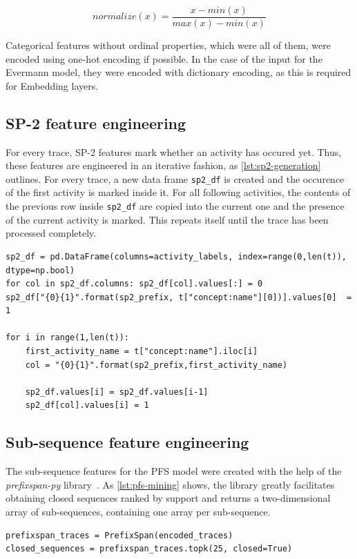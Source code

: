 $$normalize(x) = \frac{x-min(x)}{max(x)-min(x)}$$

Categorical features without ordinal properties, which were all of them, were encoded using one-hot encoding if possible. In the case of the input for the Evermann model, they were encoded with dictionary encoding, as this is required for Embedding layers.

\subsection*{SP-2 feature engineering}
For every trace, SP-2 features mark whether an activity has occured yet. Thus, these features are engineered in an iterative fashion, as \autoref{lst:sp2-generation} outlines. For every trace, a new data frame \texttt{sp2\_df} is created and the occurence of the first activity is marked inside it. For all following activities, the contents of the previous row inside \texttt{sp2\_df} are copied into the current one and the presence of the current activity is marked. This repeats itself until the trace has been processed completely.

\begin{lstlisting}[caption={SP-2 feature generation algorithm for a single trace},label={lst:sp2-generation}]
sp2_df = pd.DataFrame(columns=activity_labels, index=range(0,len(t)), dtype=np.bool)
for col in sp2_df.columns: sp2_df[col].values[:] = 0
sp2_df["{0}{1}".format(sp2_prefix, t["concept:name"][0])].values[0]  = 1

for i in range(1,len(t)):
    first_activity_name = t["concept:name"].iloc[i]
    col = "{0}{1}".format(sp2_prefix,first_activity_name)
    
    sp2_df.values[i] = sp2_df.values[i-1]
    sp2_df[col].values[i] = 1
\end{lstlisting}

\subsection*{Sub-sequence feature engineering}
The sub-sequence features for the PFS model were created with the help of the \textit{prefixspan-py} library~\cite{web:prefixspan-py}. As \autoref{lst:pfs-mining} shows, the library greatly facilitates obtaining closed sequences ranked by support and returns a two-dimensional array of sub-sequences, containing one array per sub-sequence.

\begin{lstlisting}[caption={Obtaining closed sequences using the \textit{prefixspan-py} library.}, label={lst:pfs-mining}]
prefixspan_traces = PrefixSpan(encoded_traces)
closed_sequences = prefixspan_traces.topk(25, closed=True)
\end{lstlisting}

